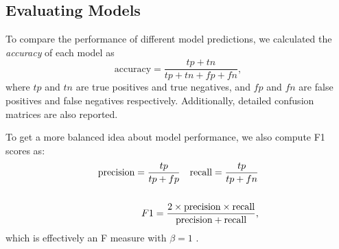 \subsection{Evaluating Models} \label{evalmodels}
To compare the performance of different model predictions, we calculated the \textit{accuracy} of each model as
\begin{equation}
    \text{accuracy} = \frac{tp+tn}{tp+tn+fp+fn},
\end{equation}
where $tp$ and $tn$ are true positives and true negatives, and $fp$ and $fn$ are false positives and false negatives respectively. Additionally, detailed confusion matrices are also reported. %

To get a more balanced idea about model performance, we also compute F1 scores as:
\begin{equation}
\begin{aligned}
    \text{precision} = \frac{tp}{tp+fp} \quad
 \text{recall} = \frac{tp}{tp+fn}\\
 \vspace{0.1cm}\\
F1 = \frac{2\times\text{precision} \times \text{recall}}{\text{precision} + \text{recall}},
\end{aligned}
\end{equation}
which is effectively an F measure with $\beta=1$ \cite{sokolova2006beyond}.

